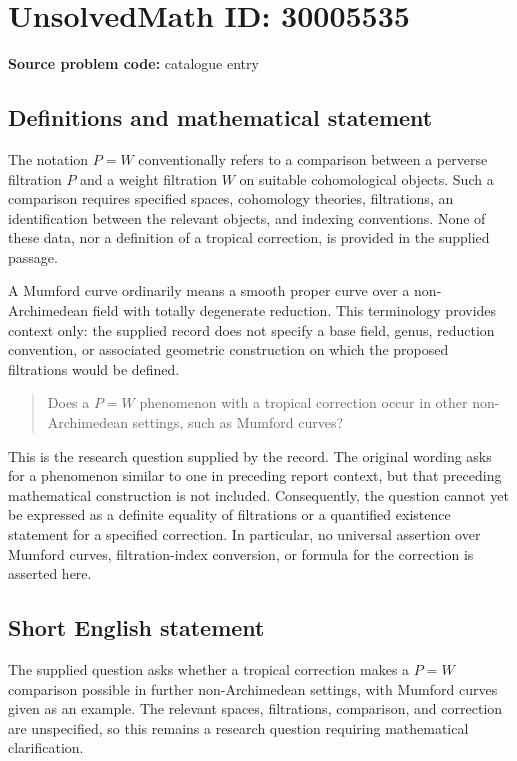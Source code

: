 \documentclass[11pt]{article}
\begin{document}
\section*{UnsolvedMath ID: 30005535}
\textbf{Source problem code:} catalogue entry
\subsection{Definitions and mathematical statement}
The notation \(P=W\) conventionally refers to a comparison between a perverse filtration \(P\) and a weight filtration \(W\) on suitable cohomological objects. Such a comparison requires specified spaces, cohomology theories, filtrations, an identification between the relevant objects, and indexing conventions. None of these data, nor a definition of a tropical correction, is provided in the supplied passage.

A Mumford curve ordinarily means a smooth proper curve over a non-Archimedean field with totally degenerate reduction. This terminology provides context only: the supplied record does not specify a base field, genus, reduction convention, or associated geometric construction on which the proposed filtrations would be defined.

\begin{quote}
Does a \(P=W\) phenomenon with a tropical correction occur in other non-Archimedean settings, such as Mumford curves?
\end{quote}

This is the research question supplied by the record. The original wording asks for a phenomenon similar to one in preceding report context, but that preceding mathematical construction is not included. Consequently, the question cannot yet be expressed as a definite equality of filtrations or a quantified existence statement for a specified correction. In particular, no universal assertion over Mumford curves, filtration-index conversion, or formula for the correction is asserted here.
\subsection{Short English statement}
The supplied question asks whether a tropical correction makes a \(P=W\) comparison possible in further non-Archimedean settings, with Mumford curves given as an example. The relevant spaces, filtrations, comparison, and correction are unspecified, so this remains a research question requiring mathematical clarification.
\end{document}
